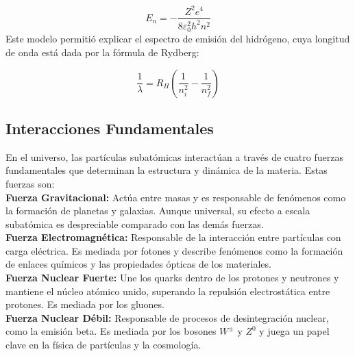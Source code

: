 \[
E_n = -\frac{Z^2 e^4}{8 \varepsilon_0^2 h^2 n^2}
\]
\noindent 
Este modelo permitió explicar el espectro de emisión del hidrógeno, cuya longitud de onda está dada por la fórmula de Rydberg:

\[
\frac{1}{\lambda} = R_H \left( \frac{1}{n_i^2} - \frac{1}{n_f^2} \right)
\]
\subsection*{Interacciones Fundamentales}
\noindent
En el universo, las partículas subatómicas interactúan a través de cuatro fuerzas fundamentales que determinan la estructura y dinámica de la materia. Estas fuerzas son:\\[0.5em]
\noindent
\textbf{Fuerza Gravitacional:} Actúa entre masas y es responsable de fenómenos como la formación de planetas y galaxias. Aunque universal, su efecto a escala subatómica es despreciable comparado con las demás fuerzas.\\[0.5em]
\noindent
\textbf{Fuerza Electromagnética:} Responsable de la interacción entre partículas con carga eléctrica. Es mediada por fotones y describe fenómenos como la formación de enlaces químicos y las propiedades ópticas de los materiales.\\[0.5em]
\noindent
\textbf{Fuerza Nuclear Fuerte:} Une los quarks dentro de los protones y neutrones y mantiene el núcleo atómico unido, superando la repulsión electrostática entre protones. Es mediada por los gluones.\\[0.5em]
\noindent
\textbf{Fuerza Nuclear Débil:} Responsable de procesos de desintegración nuclear, como la emisión beta. Es mediada por los bosones $W^\pm$ y $Z^0$ y juega un papel clave en la física de partículas y la cosmología.

